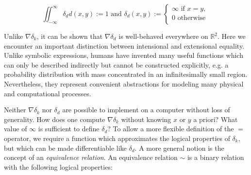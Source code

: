 \documentclass[11pt]{article}
\begin{document}
    $$
    \iint_{-\infty}^{\infty} \delta_d d(x, y) := 1 \text{ and } \delta_d(x, y) :=
    \begin{cases}
        \infty \text{ if } x = y, \\
        0 \text{ otherwise }\\
    \end{cases}
    $$

    Unlike $\nabla\delta_k$, it can be shown that $\nabla\delta_d$ is well-behaved everywhere on $\mathbb{R}^2$. Here we encounter an important distinction between intensional and extensional equality. Unlike symbolic expressions, humans have invented many useful functions which can only be described indirectly but cannot be constructed explicitly, e.g. a probability distribution with mass concentrated in an infinitesimally small region. Nevertheless, they represent convenient abstractions for modeling many physical and computational processes.

    Neither $\nabla\delta_k$ nor $\delta_d$ are possible to implement on a computer without loss of generality. How does one compute $\nabla\delta_k$ without knowing $x$ or $y$ a priori? What value of $\infty$ is sufficient to define $\delta_d$? To allow a more flexible definition of the $=$ operator, we require a function which approximates the logical properties of $\delta_k$, but which can be made differentiable like $\delta_d$. A more general notion is the concept of an \textit{equivalence relation}. An equivalence relation $\sim$ is a binary relation with the following logical properties:

\end{document}
